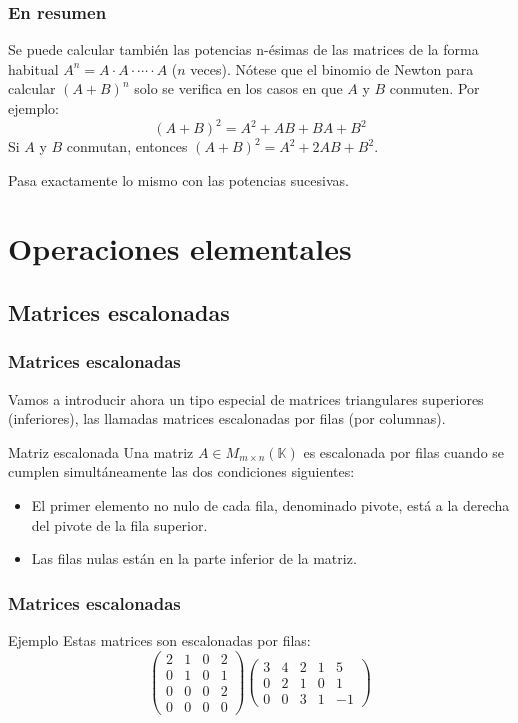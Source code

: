 \documentclass[aspectratio=169]{beamer}
\begin{document}
\begin{frame}
\frametitle{En resumen}
   
   Se puede calcular tambi\'en las potencias n-\'esimas de las matrices de la forma habitual $A^n = A\cdot A\cdot \cdots \cdot A$ ($n$ veces). N\'otese que el binomio de Newton para calcular $(A+B)^n$ solo se verifica en los casos en que $A$ y $B$ conmuten. Por ejemplo:
   \[(A+B)^2 = A^2+AB+BA+B^2\] 
Si $A$ y $B$ conmutan, entonces $(A+B)^2 = A^2+2AB+B^2$.

Pasa exactamente lo mismo con las potencias sucesivas.
 \end{frame} 
 
\section{Operaciones elementales}
\subsection{Matrices escalonadas}

 \begin{frame}
  \frametitle{Matrices escalonadas}
Vamos a introducir ahora un tipo especial de matrices triangulares superiores (inferiores), las llamadas matrices escalonadas por filas (por columnas).

 \begin{block}{Matriz escalonada}
Una matriz $A\in M_{m\times n}(\mathbb{K})$ es escalonada por filas cuando se cumplen simult\'aneamente las dos condiciones siguientes:
\begin{itemize}
\item El primer elemento no nulo de cada fila, denominado pivote, est\'a a la derecha del pivote de la fila superior.
\item Las filas nulas est\'an en la parte inferior de la matriz.
\end{itemize}
\end{block}
\end{frame} 
 

 \begin{frame}
  \frametitle{Matrices escalonadas}

 \begin{block}{Ejemplo}
Estas matrices son escalonadas por filas:
\[ \left(\begin{array}{cccc}2 & 1 & 0 & 2 \\0 & 1 & 0 & 1 \\0 & 0 & 0 & 2 \\0 & 0 & 0 & 0\end{array}\right)
\left(\begin{array}{ccccc}3 & 4 & 2 & 1 & 5 \\0 & 2 & 1 & 0 & 1 \\0 & 0 & 3 & 1 & -1\end{array}\right)
\]
\end{block}
\end{frame} 
\end{document}
